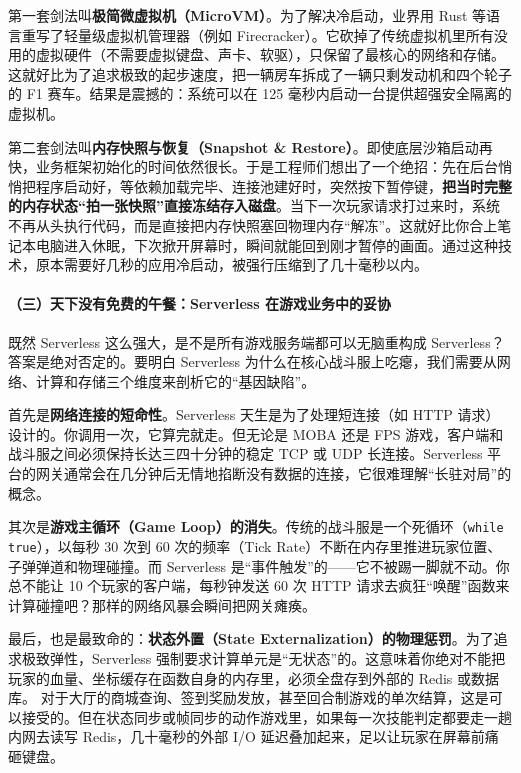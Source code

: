 第一套剑法叫\textbf{极简微虚拟机（MicroVM）}。为了解决冷启动，业界用 Rust 等语言重写了轻量级虚拟机管理器（例如 Firecracker）。它砍掉了传统虚拟机里所有没用的虚拟硬件（不需要虚拟键盘、声卡、软驱），只保留了最核心的网络和存储。这就好比为了追求极致的起步速度，把一辆房车拆成了一辆只剩发动机和四个轮子的 F1 赛车。结果是震撼的：系统可以在 125 毫秒内启动一台提供超强安全隔离的虚拟机。

第二套剑法叫\textbf{内存快照与恢复（Snapshot \& Restore）}。即使底层沙箱启动再快，业务框架初始化的时间依然很长。于是工程师们想出了一个绝招：先在后台悄悄把程序启动好，等依赖加载完毕、连接池建好时，突然按下暂停键，\textbf{把当时完整的内存状态“拍一张快照”直接冻结存入磁盘}。当下一次玩家请求打过来时，系统不再从头执行代码，而是直接把内存快照塞回物理内存“解冻”。这就好比你合上笔记本电脑进入休眠，下次掀开屏幕时，瞬间就能回到刚才暂停的画面。通过这种技术，原本需要好几秒的应用冷启动，被强行压缩到了几十毫秒以内。

\paragraph{（三）天下没有免费的午餐：Serverless 在游戏业务中的妥协}

既然 Serverless 这么强大，是不是所有游戏服务端都可以无脑重构成 Serverless？答案是绝对否定的。要明白 Serverless 为什么在核心战斗服上吃瘪，我们需要从网络、计算和存储三个维度来剖析它的“基因缺陷”。



首先是\textbf{网络连接的短命性}。Serverless 天生是为了处理短连接（如 HTTP 请求）设计的。你调用一次，它算完就走。但无论是 MOBA 还是 FPS 游戏，客户端和战斗服之间必须保持长达三四十分钟的稳定 TCP 或 UDP 长连接。Serverless 平台的网关通常会在几分钟后无情地掐断没有数据的连接，它很难理解“长驻对局”的概念。

其次是\textbf{游戏主循环（Game Loop）的消失}。传统的战斗服是一个死循环（\texttt{while true}），以每秒 30 次到 60 次的频率（Tick Rate）不断在内存里推进玩家位置、子弹弹道和物理碰撞。而 Serverless 是“事件触发”的——它不被踢一脚就不动。你总不能让 10 个玩家的客户端，每秒钟发送 60 次 HTTP 请求去疯狂“唤醒”函数来计算碰撞吧？那样的网络风暴会瞬间把网关瘫痪。

最后，也是最致命的：\textbf{状态外置（State Externalization）的物理惩罚}。为了追求极致弹性，Serverless 强制要求计算单元是“无状态”的。这意味着你绝对不能把玩家的血量、坐标缓存在函数自身的内存里，必须全盘存到外部的 Redis 或数据库。
对于大厅的商城查询、签到奖励发放，甚至回合制游戏的单次结算，这是可以接受的。但在状态同步或帧同步的动作游戏里，如果每一次技能判定都要走一趟内网去读写 Redis，几十毫秒的外部 I/O 延迟叠加起来，足以让玩家在屏幕前痛砸键盘。

